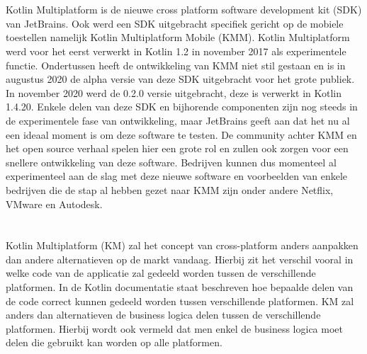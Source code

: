 \section{}
\label{sec:SVZmultiplatform}


Kotlin Multiplatform is de nieuwe cross platform software development kit (SDK) van JetBrains. Ook werd een SDK uitgebracht specifiek gericht op de mobiele toestellen namelijk Kotlin Multiplatform Mobile (KMM). Kotlin Multiplatform werd voor het eerst verwerkt in Kotlin 1.2 in november 2017 als experimentele functie.\autocite{Jemerov2017} 
Ondertussen heeft de ontwikkeling van KMM niet stil gestaan en is in augustus 2020 de alpha versie van deze SDK uitgebracht voor het grote publiek.\autocite{Petrova2020} In november 2020 werd de 0.2.0 versie uitgebracht, deze is verwerkt in Kotlin 1.4.20.\autocite{JetBrains2020} Enkele delen van deze SDK en bijhorende componenten zijn nog steeds in de experimentele fase van ontwikkeling, maar JetBrains geeft aan dat het nu al een ideaal moment is om deze software te testen.\autocite{Petrova2020} De community achter KMM en het open source verhaal spelen hier een grote rol en zullen ook zorgen voor een snellere ontwikkeling van deze software. Bedrijven kunnen dus momenteel al experimenteel aan de slag met deze nieuwe software en voorbeelden van enkele bedrijven die de stap al hebben gezet naar KMM zijn onder andere Netflix, VMware en Autodesk.\autocite{KotlinKMMCaseStudies}

\subsection{}
\label{sec:SVZKM}

\subsection{}
\label{sec:SVZKMM}

\section{}
\label{sec:SVZKMMvsandere}
Kotlin Multiplatform (KM) zal het concept van cross-platform anders aanpakken dan andere alternatieven op de markt vandaag. Hierbij zit het verschil vooral in welke code van de applicatie zal gedeeld worden tussen de verschillende platformen. In de Kotlin documentatie staat beschreven hoe bepaalde delen van de code correct kunnen gedeeld worden tussen verschillende platformen. KM zal anders dan alternatieven de business logica delen tussen de verschillende platformen.\autocite{Kotlin2021} Hierbij wordt ook vermeld dat men enkel de business logica moet delen die gebruikt kan worden op alle platformen. 

